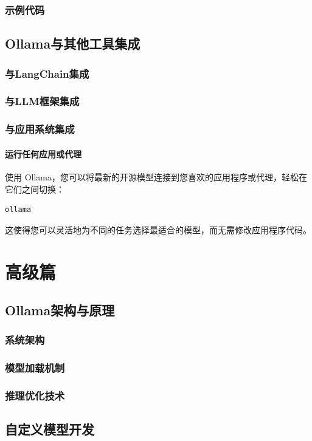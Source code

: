 \documentclass[12pt,UTF8]{ctexbook}
\begin{document}
\section{示例代码}

\chapter{Ollama与其他工具集成}
\section{与LangChain集成}
\section{与LLM框架集成}
\section{与应用系统集成}

\subsection{运行任何应用或代理}

使用 Ollama，您可以将最新的开源模型连接到您喜欢的应用程序或代理，轻松在它们之间切换：

\begin{verbatim}
ollama
\end{verbatim}

这使得您可以灵活地为不同的任务选择最适合的模型，而无需修改应用程序代码。

\part{高级篇}
\chapter{Ollama架构与原理}
\section{系统架构}
\section{模型加载机制}
\section{推理优化技术}

\chapter{自定义模型开发}
\end{document}

